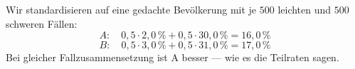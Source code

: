 \begin{aufgabe}
\begin{center}
\begin{minipage}{0.86\textwidth}
\end{minipage}
\end{center}

Wir standardisieren auf eine gedachte Bevölkerung mit je $500$ leichten und $500$ schweren Fällen:
\[ A: \quad 0{,}5 \cdot 2{,}0\,\% + 0{,}5 \cdot 30{,}0\,\% = 16{,}0\,\% \]
\[ B: \quad 0{,}5 \cdot 3{,}0\,\% + 0{,}5 \cdot 31{,}0\,\% = 17{,}0\,\% \]
Bei gleicher Fallzusammensetzung ist A besser --- wie es die Teilraten sagen. \checkmark
\end{aufgabe}


